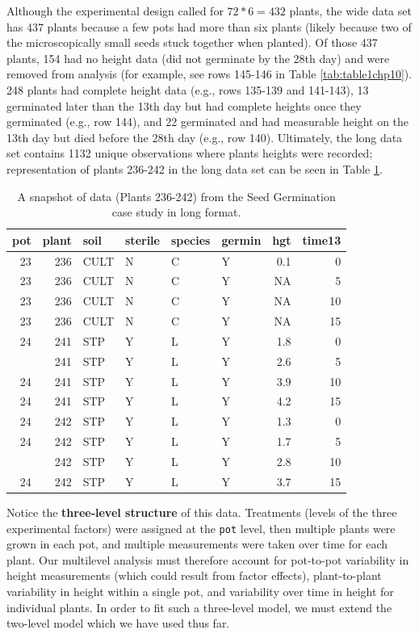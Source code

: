 \documentclass[
]{krantz}
\begin{document}
Although the experimental design called for \(72*6=432\) plants, the wide data set has 437 plants because a few pots had more than six plants (likely because two of the microscopically small seeds stuck together when planted). Of those 437 plants, 154 had no height data (did not germinate by the 28th day) and were removed from analysis (for example, see rows 145-146 in Table \ref{tab:table1chp10}). 248 plants had complete height data (e.g., rows 135-139 and 141-143), 13 germinated later than the 13th day but had complete heights once they germinated (e.g., row 144), and 22 germinated and had measurable height on the 13th day but died before the 28th day (e.g., row 140). Ultimately, the long data set contains 1132 unique observations where plants heights were recorded; representation of plants 236-242 in the long data set can be seen in Table \ref{tab:table2chp10}.

\begin{table}[t]

\caption{\label{tab:table2chp10}A snapshot of data (Plants 236-242) from the Seed Germination case study in long format.}
\centering
\begin{tabular}{rrllllrr}
\toprule
pot & plant & soil & sterile & species & germin & hgt & time13\\
\midrule
23 & 236 & CULT & N & C & Y & 0.1 & 0\\
23 & 236 & CULT & N & C & Y & NA & 5\\
23 & 236 & CULT & N & C & Y & NA & 10\\
23 & 236 & CULT & N & C & Y & NA & 15\\
24 & 241 & STP & Y & L & Y & 1.8 & 0\\
\addlinespace
24 & 241 & STP & Y & L & Y & 2.6 & 5\\
24 & 241 & STP & Y & L & Y & 3.9 & 10\\
24 & 241 & STP & Y & L & Y & 4.2 & 15\\
24 & 242 & STP & Y & L & Y & 1.3 & 0\\
24 & 242 & STP & Y & L & Y & 1.7 & 5\\
\addlinespace
24 & 242 & STP & Y & L & Y & 2.8 & 10\\
24 & 242 & STP & Y & L & Y & 3.7 & 15\\
\bottomrule
\end{tabular}
\end{table}

Notice the \textbf{three-level structure} of this data. Treatments (levels of the three experimental factors) were assigned at the \texttt{pot} level, then multiple plants were grown in each pot, and multiple measurements were taken over time for each plant. Our multilevel analysis must therefore account for pot-to-pot variability in height measurements (which could result from factor effects), plant-to-plant variability in height within a single pot, and variability over time in height for individual plants. In order to fit such a three-level model, we must extend the two-level model which we have used thus far.
\end{document}
